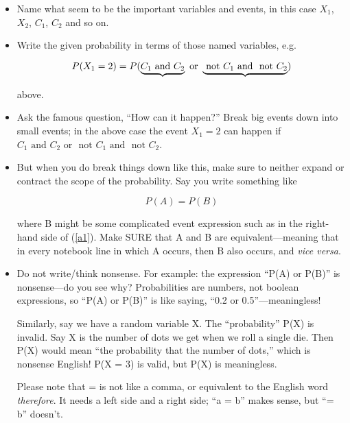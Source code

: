 \begin{itemize}

\item Name what seem to be the important variables and events, in this case 
$X_1$, $X_2$, $C_1$, $C_2$ and so on.

\item Write the given probability in terms of those named variables,
e.g.  

\begin{equation}
P(X_1 = 2) 
= P(\underbrace{ C_1 {\rm ~and~} C_2 } {\rm ~or~ } 
\underbrace{ {\rm ~not~} C_1 {\rm ~and~} ~{\rm not}~ C_2 } ) 
\end{equation}

above.

\item Ask the famous question, ``How can it happen?''  
Break big events down into small events; in the above case
the event $X_1 = 2$ can happen if $C_1 
\textrm{ and } 
C_2 
\textrm{ or } 
\textrm{ not } 
C_1 
\textrm{ and } 
\textrm{ not } 
C_2$.

\item But when you do break things down like this, make sure to neither
expand or contract the scope of the probability.  Say you write
something like

\begin{equation}
P(A) = P(B)
\end{equation}

where B might be some complicated event expression such as in the
right-hand side of (\ref{a1}).  Make SURE that A and B are
equivalent---meaning that in every notebook line in which A occurs, then
B also occurs, and {\it vice versa}.

\item Do not write/think nonsense.  For example: the expression ``P(A)
or P(B)'' is nonsense---do you see why?  Probabilities are numbers, not
boolean expressions, so ``P(A) or P(B)'' is like saying, ``0.2 or
0.5''---meaningless!

Similarly, say we have a random variable X.  The ``probability'' P(X) is
invalid.  Say X is the number of dots we get when we roll a single die.
Then P(X) would mean ``the probability that the number of dots,'' which
is nonsense English!  P(X = 3) is valid, but P(X) is meaningless. 

Please note that = is not like a comma, or equivalent to the English
word {\it therefore}.  It needs a left side and a right side; ``a = b''
makes sense, but ``= b'' doesn't.


\end{itemize}

